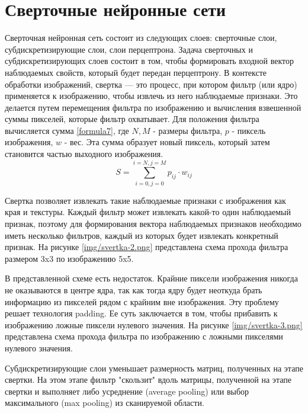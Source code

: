 \chapter{Сверточные нейронные сети}
Сверточная нейронная сеть состоит из следующих слоев: сверточные слои, субдискретизирующие слои, слои перцептрона. Задача сверточных и субдискретизирующих слоев состоит в том, чтобы формировать входной вектор наблюдаемых свойств, который будет передан перцептрону. В контексте обработки изображений, свертка --- это процесс, при котором фильтр (или ядро) применяется к изображению, чтобы извлечь из него наблюдаемые признаки. Это делается путем перемещения фильтра по изображению и вычисления взвешенной суммы пикселей, которые фильтр охватывает. Для положения фильтра вычисляется сумма \ref{formula7}, где $N, M$ - размеры фильтра, $p$ - пиксель изображения, $w$ - вес. Эта сумма образует новый пиксель, который затем становится частью выходного изображения. 
\begin{equation}
S = \sum_{i=0, j=0}^{i=N, j=M}p_{ij} \cdot w_{ij}
\label{formula7}
\end{equation}

Свертка позволяет извлекать такие наблюдаемые признаки с изображения как края и текстуры. Каждый фильтр может извлекать какой-то один наблюдаемый признак, поэтому для формирования вектора наблюдаемых признаков необходимо иметь несколько фильтров, каждый из которых будет извлекать конкретный признак. На рисунке \ref{img/svertka-2.png} представлена схема прохода фильтра размером 3x3 по изображению 5x5.


В представленной схеме есть недостаток. Крайние пиксели изображения никогда не оказываются в центре ядра, так как тогда ядру будет неоткуда брать информацию из пикселей рядом с крайним вне изображения. Эту проблему решает технология padding. Ее суть заключается в том, чтобы прибавить к изображению ложные пиксели нулевого значения. На рисунке \ref{img/svertka-3.png} представлена схема прохода фильтра по изображению с ложными пикселями нулевого значения.


Субдискретизирующие слои уменьшает размерность матриц, полученных на этапе свертки. На этом этапе фильтр "скользит" вдоль матрицы, полученной на этапе свертки и выполняет либо усреднение (average pooling) или выбор максимального (max pooling) из сканируемой области.

